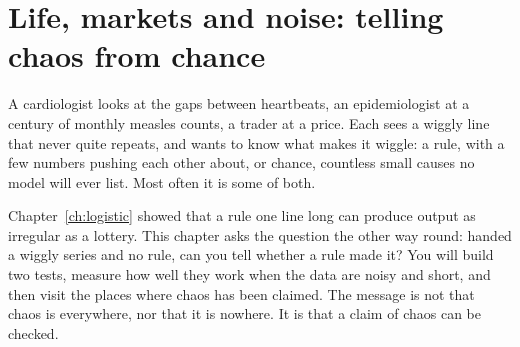 
\chapter{Life, markets and noise: telling chaos from chance}
\label{ch:life}

\noindent
A cardiologist looks at the gaps between heartbeats, an epidemiologist at a
century of monthly measles counts, a trader at a price. Each sees a wiggly
line that never quite repeats, and wants to know what makes it wiggle: a
rule, with a few numbers pushing each other about, or chance, countless small
causes no model will ever list. Most often it is some of both.

Chapter~\ref{ch:logistic} showed that a rule one line long can produce output
as irregular as a lottery. This chapter asks the question the other way
round: handed a wiggly series and no rule, can you tell whether a rule made
it? You will build two tests, measure how well they work when the data are
noisy and short, and then visit the places where chaos has been claimed. The
message is not that chaos is everywhere, nor that it is nowhere. It is that a
claim of chaos can be checked.

\begin{outcomes}
\end{outcomes}

